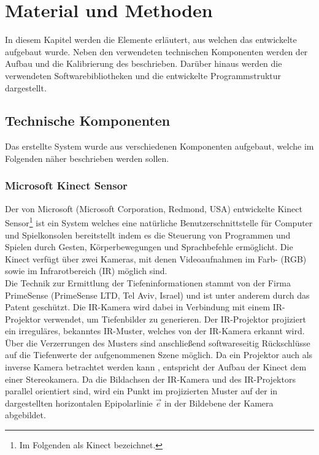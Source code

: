 \chapter{Material und Methoden}
\label{chap.material}
\prever{
\red[%
]%
}
In diesem Kapitel werden die Elemente erläutert, aus welchen das entwickelte \kps{} aufgebaut wurde. Neben den verwendeten technischen Komponenten werden der Aufbau und die Kalibrierung des  beschrieben. Darüber hinaus werden die verwendeten Softwarebibliotheken und die entwickelte Programmstruktur dargestellt.

\section{Technische Komponenten}
Das erstellte System wurde aus verschiedenen Komponenten aufgebaut, welche im Folgenden näher beschrieben werden sollen. 
\prever{
}
\subsection{Microsoft Kinect\textsuperscript{\texttrademark} Sensor}
\label{chap.kinect}
Der von Microsoft (Microsoft Corporation, Redmond, USA) entwickelte Kinect\textsuperscript{\texttrademark} Sensor\footnote{Im Folgenden als Kinect bezeichnet.} ist ein System welches eine natürliche Benutzerschnittstelle für Computer und Spielkonsolen bereitstellt indem es die Steuerung von Programmen und Spielen durch Gesten, Körperbewegungen und Sprachbefehle ermöglicht. Die Kinect verfügt über zwei Kameras, mit denen Videoaufnahmen im Farb- (RGB) sowie im Infrarotbereich (IR) möglich sind.\\
Die Technik zur Ermittlung der Tiefeninformationen stammt von der Firma PrimeSense (PrimeSense LTD, Tel Aviv, Israel) und ist unter anderem durch das Patent \cite{Freedman2008} geschützt. Die IR-Kamera wird dabei in Verbindung mit einem IR-Projektor verwendet, um Tiefenbilder zu generieren. Der IR-Projektor projiziert ein irreguläres, bekanntes IR-Muster, welches von der IR-Kamera erkannt wird. Über die Verzerrungen des Musters sind anschließend softwareseitig Rückschlüsse auf die Tiefenwerte der aufgenommenen Szene möglich. Da ein Projektor auch als inverse Kamera betrachtet werden kann \cite{Kimura2007}, entspricht der Aufbau der Kinect dem einer Stereokamera. Da die Bildachsen der IR-Kamera und des IR-Projektors parallel orientiert sind, wird ein Punkt im projizierten Muster auf der in  dargestellten horizontalen Epipolarlinie $\vec{e}$ in der Bildebene der Kamera abgebildet. 

